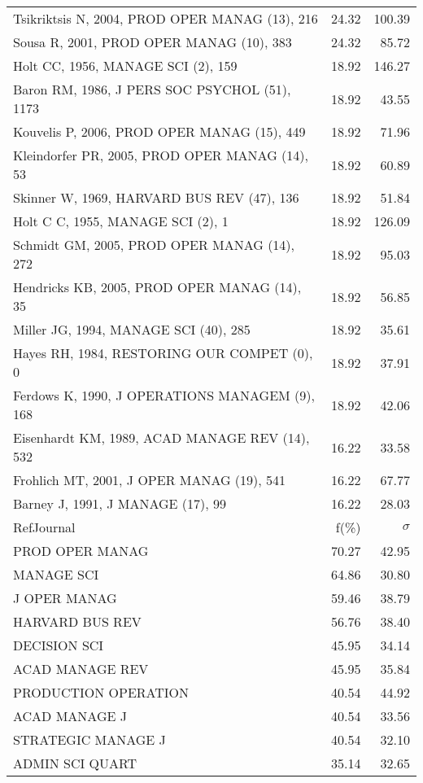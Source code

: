 \documentclass[a4paper,11pt]{report}
\begin{document}
\begin{landscape}
\begin{table}[!ht]
{\begin{tabular}{|l r r|}
Tsikriktsis N, 2004, PROD OPER MANAG (13), 216 & 24.32 & 100.39\\
Sousa R, 2001, PROD OPER MANAG (10), 383 & 24.32 & 85.72\\
Holt CC, 1956, MANAGE SCI (2), 159 & 18.92 & 146.27\\
Baron RM, 1986, J PERS SOC PSYCHOL (51), 1173 & 18.92 & 43.55\\
Kouvelis P, 2006, PROD OPER MANAG (15), 449 & 18.92 & 71.96\\
Kleindorfer PR, 2005, PROD OPER MANAG (14), 53 & 18.92 & 60.89\\
Skinner W, 1969, HARVARD BUS REV (47), 136 & 18.92 & 51.84\\
Holt C C, 1955, MANAGE SCI (2), 1 & 18.92 & 126.09\\
Schmidt GM, 2005, PROD OPER MANAG (14), 272 & 18.92 & 95.03\\
Hendricks KB, 2005, PROD OPER MANAG (14), 35 & 18.92 & 56.85\\
Miller JG, 1994, MANAGE SCI (40), 285 & 18.92 & 35.61\\
Hayes RH, 1984, RESTORING OUR COMPET (0), 0 & 18.92 & 37.91\\
Ferdows K, 1990, J OPERATIONS MANAGEM (9), 168 & 18.92 & 42.06\\
Eisenhardt KM, 1989, ACAD MANAGE REV (14), 532 & 16.22 & 33.58\\
Frohlich MT, 2001, J OPER MANAG (19), 541 & 16.22 & 67.77\\
Barney J, 1991, J MANAGE (17), 99 & 16.22 & 28.03\\
\hline
\hline
RefJournal & f(\%) & $\sigma$\\
\hline
PROD OPER MANAG & 70.27 & 42.95\\
MANAGE SCI & 64.86 & 30.80\\
J OPER MANAG & 59.46 & 38.79\\
HARVARD BUS REV & 56.76 & 38.40\\
DECISION SCI & 45.95 & 34.14\\
ACAD MANAGE REV & 45.95 & 35.84\\
PRODUCTION OPERATION & 40.54 & 44.92\\
ACAD MANAGE J & 40.54 & 33.56\\
STRATEGIC MANAGE J & 40.54 & 32.10\\
ADMIN SCI QUART & 35.14 & 32.65\\
\hline
\end{tabular}
}
\end{table}

\clearpage


\end{landscape}
\end{document}
